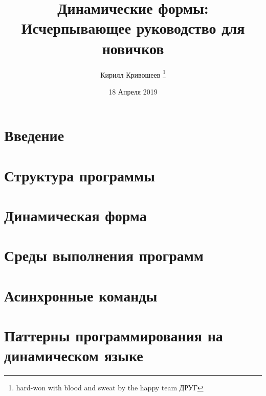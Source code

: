\documentclass[10pt]{book}
\begin{document}
    \pagestyle{empty}   
    \title{Динамические формы: Исчерпывающее руководство для новичков}
	\author{Кирилл Кривошеев \thanks{hard-won with blood and sweat by the happy team ДРУГ}}
    \date{18 Апреля 2019}
    
    \begin{titlepage}
    \maketitle
    \end{titlepage}

    \mainmatter
    \tableofcontents

	\chapter{Введение}
	
	
	\chapter{Структура программы}
    

	\chapter{Динамическая форма}\label{sec:dynfom} 
    
    

    
    \chapter{Среды выполнения программ}\label{sec:environment}
    
    
    \chapter{Асинхронные команды}
    

	\chapter{Паттерны программирования на динамическом языке}
    

    \clearpage
    \printglossaries 
\end{document}
